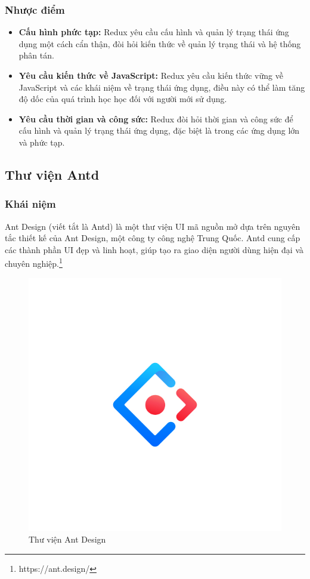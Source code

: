 \subsubsection{Nhược điểm}
\begin{itemize}
  \item \textbf{Cấu hình phức tạp:} Redux yêu cầu cấu hình và quản lý trạng thái ứng dụng một cách cẩn thận, đòi hỏi kiến thức về quản lý trạng thái và hệ thống phân tán.
  \item \textbf{Yêu cầu kiến thức về JavaScript:} Redux yêu cầu kiến thức vững về JavaScript và các khái niệm về trạng thái ứng dụng, điều này có thể làm tăng độ dốc của quá trình học học đối với người mới sử dụng.
  \item \textbf{Yêu cầu thời gian và công sức:} Redux đòi hỏi thời gian và công sức để cấu hình và quản lý trạng thái ứng dụng, đặc biệt là trong các ứng dụng lớn và phức tạp.
\end{itemize}

\subsection{Thư viện Antd}
\subsubsection{Khái niệm}
\noindent Ant Design (viết tắt là Antd) là một thư viện UI mã nguồn mở dựa trên nguyên tắc thiết kế của Ant Design, một công ty công nghệ Trung Quốc. Antd cung cấp các thành phần UI đẹp và linh hoạt, giúp tạo ra giao diện người dùng hiện đại và chuyên nghiệp.\footnote{https://ant.design/}
\begin{figure}[H]
  \begin{center}
    \includegraphics[scale=0.3]{images/hieu/phuluc/antd.jpg}
    \caption{Thư viện Ant Design}
  \end{center}
\end{figure}
